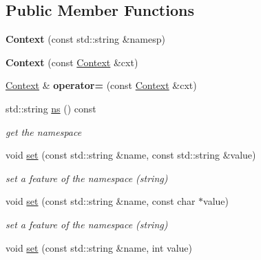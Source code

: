 \subsection*{Public Member Functions}
\begin{DoxyCompactItemize}
\item 
\hypertarget{classcfg_1_1Context_a0bf621792bb3954f475b2bbe6c69f6b9}{{\bfseries Context} (const std\-::string \&namesp)}\label{classcfg_1_1Context_a0bf621792bb3954f475b2bbe6c69f6b9}

\item 
\hypertarget{classcfg_1_1Context_a648f69ee38af881ca2146ee0165305c4}{{\bfseries Context} (const \hyperlink{classcfg_1_1Context}{Context} \&cxt)}\label{classcfg_1_1Context_a648f69ee38af881ca2146ee0165305c4}

\item 
\hypertarget{classcfg_1_1Context_ae983a160273978702ced02fa2dbe427a}{\hyperlink{classcfg_1_1Context}{Context} \& {\bfseries operator=} (const \hyperlink{classcfg_1_1Context}{Context} \&cxt)}\label{classcfg_1_1Context_ae983a160273978702ced02fa2dbe427a}

\item 
\hypertarget{classcfg_1_1Context_a7f9e49a8635fd52a86d62f4782510930}{std\-::string \hyperlink{classcfg_1_1Context_a7f9e49a8635fd52a86d62f4782510930}{ns} () const }\label{classcfg_1_1Context_a7f9e49a8635fd52a86d62f4782510930}

\begin{DoxyCompactList}\small\item\em get the namespace \end{DoxyCompactList}\item 
\hypertarget{classcfg_1_1Context_af1ab6523fda2781a6d7d3316fea68fe8}{void \hyperlink{classcfg_1_1Context_af1ab6523fda2781a6d7d3316fea68fe8}{set} (const std\-::string \&name, const std\-::string \&value)}\label{classcfg_1_1Context_af1ab6523fda2781a6d7d3316fea68fe8}

\begin{DoxyCompactList}\small\item\em set a feature of the namespace (string) \end{DoxyCompactList}\item 
\hypertarget{classcfg_1_1Context_a983796d226d2d2deab971f354b2ac649}{void \hyperlink{classcfg_1_1Context_a983796d226d2d2deab971f354b2ac649}{set} (const std\-::string \&name, const char $\ast$value)}\label{classcfg_1_1Context_a983796d226d2d2deab971f354b2ac649}

\begin{DoxyCompactList}\small\item\em set a feature of the namespace (string) \end{DoxyCompactList}\item 
\hypertarget{classcfg_1_1Context_a06edab7e54985b14fea0e088859f2c4b}{void \hyperlink{classcfg_1_1Context_a06edab7e54985b14fea0e088859f2c4b}{set} (const std\-::string \&name, int value)}\label{classcfg_1_1Context_a06edab7e54985b14fea0e088859f2c4b}


\end{DoxyCompactItemize}
